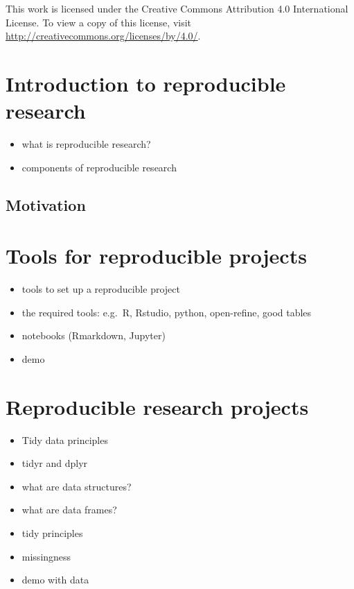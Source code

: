 \documentclass[]{book}
\providecommand{\tightlist}{%
  \setlength{\itemsep}{0pt}\setlength{\parskip}{0pt}}
\begin{document}
This work is licensed under the Creative Commons Attribution 4.0 International License.
To view a copy of this license, visit \url{http://creativecommons.org/licenses/by/4.0/}.

\hypertarget{introduction-to-reproducible-research}{%
\chapter{Introduction to reproducible research}\label{introduction-to-reproducible-research}}

\begin{itemize}
\tightlist
\item
  what is reproducible research?
\item
  components of reproducible research
\end{itemize}

\hypertarget{motivation}{%
\section{Motivation}\label{motivation}}

\hypertarget{tools-for-reproducible-projects}{%
\chapter{Tools for reproducible projects}\label{tools-for-reproducible-projects}}

\begin{itemize}
\item
  tools to set up a reproducible project
\item
  the required tools: e.g.~R, Rstudio, python, open-refine, good tables
\item
  notebooks (Rmarkdown, Jupyter)
\item
  demo
\end{itemize}

\hypertarget{reproducible-research-projects}{%
\chapter{Reproducible research projects}\label{reproducible-research-projects}}

\begin{itemize}
\item
  Tidy data principles
\item
  tidyr and dplyr
\item
  what are data structures?
\item
  what are data frames?
\item
  tidy principles
\item
  missingness
\item
  demo with data
\end{itemize}
\end{document}

